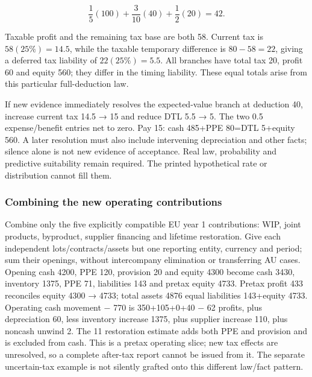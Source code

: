 \[\frac15(100)+\frac3{10}(40)+\frac12(20)=42.\]

Taxable profit and the remaining tax base are both 58. Current tax is \(58(25\%)=14.5\), while the taxable temporary difference is \(80-58=22\), giving a deferred tax liability of \(22(25\%)=5.5\). All branches have total tax 20, profit 60 and equity 560; they differ in the timing liability. These equal totals arise from this particular full-deduction law.

If new evidence immediately resolves the expected-value branch at deduction 40, increase current tax 14.5 → 15 and reduce DTL 5.5 → 5. The two 0.5 expense/benefit entries net to zero. Pay 15: cash 485+PPE 80=DTL 5+equity 560. A later resolution must also include intervening depreciation and other facts; silence alone is not new evidence of acceptance. Real law, probability and predictive suitability remain required. The printed hypothetical rate or distribution cannot fill them.

\hypertarget{combining-the-new-operating-contributions}{%
\subsubsection{Combining the new operating contributions}\label{combining-the-new-operating-contributions}}

Combine only the five explicitly compatible EU year 1 contributions: WIP, joint products, byproduct, supplier financing and lifetime restoration. Give each independent lots/contracts/assets but one reporting entity, currency and period; sum their openings, without intercompany elimination or transferring AU cases. Opening cash 4200, PPE 120, provision 20 and equity 4300 become cash 3430, inventory 1375, PPE 71, liabilities 143 and pretax equity 4733. Pretax profit 433 reconciles equity 4300 → 4733; total assets 4876 equal liabilities 143+equity 4733. Operating cash movement − 770 is 350+105+0+40 − 62 profits, plus depreciation 60, less inventory increase 1375, plus supplier increase 110, plus noncash unwind 2. The 11 restoration estimate adds both PPE and provision and is excluded from cash. This is a pretax operating slice; new tax effects are unresolved, so a complete after-tax report cannot be issued from it. The separate uncertain-tax example is not silently grafted onto this different law/fact pattern.
